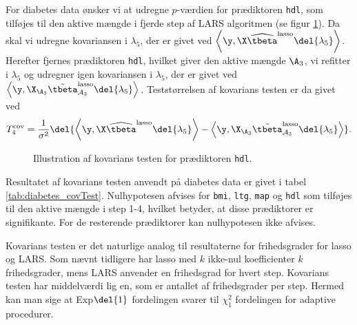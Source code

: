 For diabetes data ønsker vi at udregne \(p\)-værdien for prædiktoren \texttt{hdl}, som tilføjes til den aktive mængde i fjerde step af LARS algoritmen (se figur \ref{fig:diabetes_covTest}). 
Da skal vi udregne kovariansen i \(\lambda_5\), der er givet ved \(\left\langle \y, \X \widehat{\tbeta}^\text{lasso} \del{\lambda_5} \right\rangle\).
Herefter fjernes prædiktoren \texttt{hdl}, hvilket giver den aktive mængde \(\A_{3}\), vi refitter i \(\lambda_5\) og udregner igen kovariansen i \(\lambda_5\), der er givet ved \(\left\langle  \y, \X_{\A_{3}} \tilde{\tbeta}^\text{lasso}_{\mathcal{A}_{3}} \del{\lambda_{5}} \right\rangle\).
Teststørrelsen af kovarians testen er da givet ved
\begin{align*}
T_4^\text{cov} = \frac{1}{\sigma^2} \del{ \left\langle \y, \X \widehat{\tbeta}^\text{lasso} \del{\lambda_{5}} \right\rangle - \left\langle  \y, \X_{\A_{3}} \tilde{\tbeta}^\text{lasso}_{\mathcal{A}_{3}} \del{\lambda_{5}} \right\rangle}.
\end{align*}
%
\begin{figure}[H]
\centering
{}
\caption{Illustration af kovarians testen for prædiktoren \texttt{hdl}.} \label{fig:diabetes_covTest}
\end{figure}
%
Resultatet af kovarians testen anvendt på diabetes data er givet i tabel \ref{tab:diabetes_covTest}.
Nulhypotesen afvises for \texttt{bmi}, \texttt{ltg}, \texttt{map} og \texttt{hdl} som tilføjes til den aktive mængde i step 1-4, hvilket betyder, at disse prædiktorer er signifikante.
For de resterende prædiktorer kan nulhypotesen ikke afvises.
%



Kovarians testen er det naturlige analog til resultaterne for frihedsgrader for lasso og LARS.
Som nævnt tidligere har lasso med \(k\) ikke-nul koefficienter \(k\) frihedsgrader, mens LARS anvender en frihedsgrad for hvert step.
Kovarians testen har middelværdi lig en, som er antallet af frihedsgrader per step.
Hermed kan man sige at Exp\(\del{1}\) fordelingen svarer til \(\chi_1^2\) fordelingen for adaptive procedurer.

